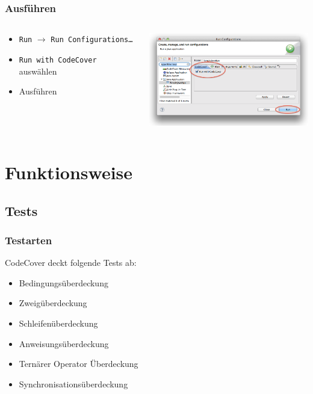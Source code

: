\documentclass{beamer}
\begin{document}
  \begin{frame}
    \frametitle{Ausführen}
    \begin{columns}
      \begin{column}{4cm}
        \begin{itemize}
          \item \texttt{Run} $\rightarrow$ \texttt{Run Configurations\dots}
          \item \texttt{Run with CodeCover} auswählen
          \item Ausführen
        \end{itemize}
        \vspace{2cm}
      \end{column}
      \begin{column}{6cm}
        \begin{overprint}
          \includegraphics[width=7cm]{pictures/runconfigurations.png}
        \end{overprint}
      \end{column}
    \end{columns}
  \end{frame}

  \section{Funktionsweise}
  \subsection{Tests}
  \begin{frame}\frametitle{Testarten}
  CodeCover deckt folgende Tests ab:
    \begin{itemize}
      \item Bedingungsüberdeckung
      \item Zweigüberdeckung
      \item Schleifenüberdeckung
      \item Anweisungsüberdeckung
      \item Ternärer Operator Überdeckung
      \item Synchronisationsüberdeckung
    \end{itemize}
  \end{frame}
\end{document}
